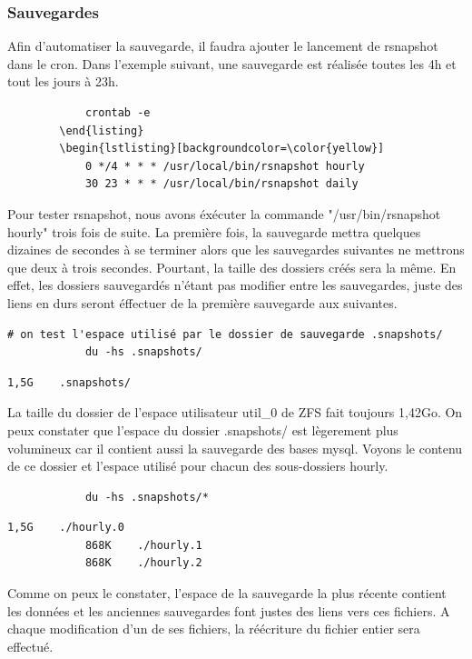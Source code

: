 \documentclass[a4paper]{report}
\begin{document}
		\subsubsection{Sauvegardes}
		Afin d'automatiser la sauvegarde, il faudra ajouter le lancement de rsnapshot dans le cron. Dans l'exemple suivant, une sauvegarde est réalisée toutes les 4h et tout les jours à 23h.
		\begin{lstlisting}
			crontab -e
		\end{listing}
		\begin{lstlisting}[backgroundcolor=\color{yellow}]
			0 */4 * * * /usr/local/bin/rsnapshot hourly
			30 23 * * * /usr/local/bin/rsnapshot daily
		\end{lstlisting}
		Pour tester rsnapshot, nous avons éxécuter la commande "/usr/bin/rsnapshot hourly" trois fois de suite. La première fois, la sauvegarde mettra quelques dizaines de secondes à se terminer alors que les sauvegardes suivantes ne mettrons que deux à trois secondes. Pourtant, la taille des dossiers créés sera la même. En effet, les dossiers sauvegardés n'étant pas modifier entre les sauvegardes, juste des liens en durs seront éffectuer de la première sauvegarde aux suivantes.
		\begin{lstlisting}[texcl]
			# on test l'espace utilisé par le dossier de sauvegarde .snapshots/
			du -hs .snapshots/
		\end{lstlisting}
		\begin{lstlisting}[backgroundcolor=\color{yellow}]
			1,5G	.snapshots/
		\end{lstlisting}
		La taille du dossier de l'espace utilisateur util\_0 de ZFS fait toujours 1,42Go. On peux constater que l'espace du dossier .snapshots/ est lègerement plus volumineux car il contient aussi la sauvegarde des bases mysql. Voyons le contenu de ce dossier et l'espace utilisé pour chacun des sous-dossiers hourly.
		\begin{lstlisting}
			du -hs .snapshots/*
		\end{lstlisting}
		\begin{lstlisting}[backgroundcolor=\color{yellow}]
			1,5G	./hourly.0
			868K	./hourly.1
			868K	./hourly.2
		\end{lstlisting}
		Comme on peux le constater, l'espace de la sauvegarde la plus récente contient les données et les anciennes sauvegardes font justes des liens vers ces fichiers. A chaque modification d'un de ses fichiers, la réécriture du fichier entier sera effectué.
\end{document}
